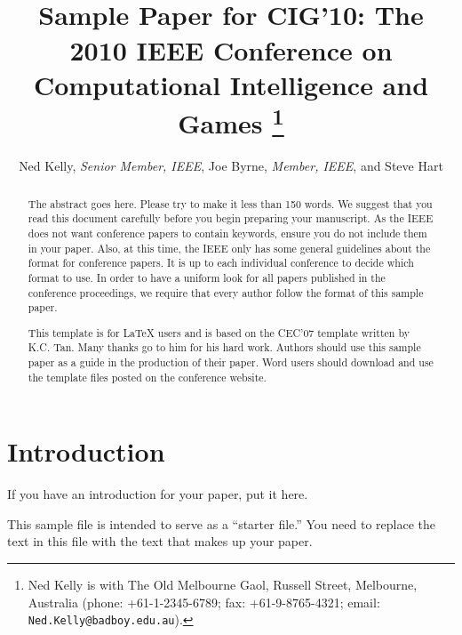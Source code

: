 \documentclass[conference]{IEEEtran}
\begin{document}
\title{\ \\ \LARGE\bf Sample Paper for CIG'10: The 2010 IEEE
Conference on Computational Intelligence and Games \thanks{Ned Kelly
is with The Old Melbourne Gaol, Russell Street, Melbourne, Australia
(phone: +61-1-2345-6789; fax: +61-9-8765-4321; email: {\tt
Ned.Kelly@badboy.edu.au}).}}

\author{Ned Kelly, {\it Senior Member, IEEE}, Joe Byrne, {\it Member, IEEE}, and Steve Hart}


\maketitle

\begin{abstract}
The abstract goes here.  Please try to make it less than 150 words.
We suggest that you read this document carefully before you begin
preparing your manuscript.  As the IEEE does not want conference papers
to contain keywords, ensure you do not include them in your paper.
Also, at this time, the IEEE only has some general guidelines about the
format for conference papers.  It is up to each individual conference
to decide which format to use.  In order to have a uniform look for all
papers published in the conference proceedings, we require that every
author follow the format of this sample paper.

This template is for LaTeX users and is based on the CEC'07 template
written by K.C. Tan. Many thanks go to him for his hard work.
Authors should use this sample paper as a guide in the production of
their paper. Word users should download and use the template files
posted on the conference website.
\end{abstract}


\section{Introduction}
If you have an introduction for your paper, put it here.

This sample file is intended to serve as a ``starter file.''  You
need to replace the text in this file with the text that makes up
your paper.
\end{document}
